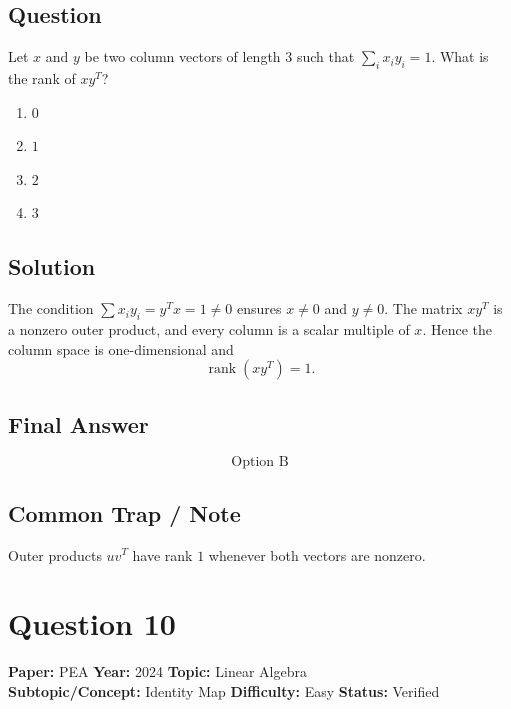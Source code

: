 \documentclass[11pt]{article}
\begin{document}
\subsection*{Question}
Let $x$ and $y$ be two column vectors of length $3$ such that $\sum_{i}x_{i}y_{i}=1$. What is the rank of $xy^{T}$?
\begin{enumerate}[label=(\Alph*)]
\item $0$
\item $1$
\item $2$
\item $3$
\end{enumerate}

\subsection*{Solution}
The condition $\sum x_iy_i=y^{T}x=1\ne 0$ ensures $x\ne 0$ and $y\ne 0$. The matrix $xy^{T}$ is a nonzero outer product, and every column is a scalar multiple of $x$. Hence the column space is one-dimensional and
\[
\operatorname{rank}(xy^{T})=1.
\]

\subsection*{Final Answer}
\[
\boxed{\text{Option B}}
\]

\subsection*{Common Trap / Note}
Outer products $uv^T$ have rank $1$ whenever both vectors are nonzero.

\section*{Question 10}
\textbf{Paper:} PEA \quad \textbf{Year:} 2024 \quad \textbf{Topic:} Linear Algebra \\
\textbf{Subtopic/Concept:} Identity Map \quad \textbf{Difficulty:} Easy \quad \textbf{Status:} Verified
\end{document}

